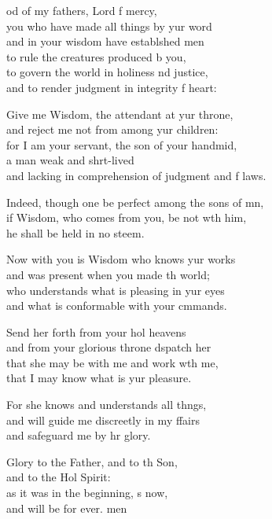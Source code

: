 \settowidth{\versewidth}{Indeed, though one be perfect among the sons of men, +}
\begin{psalmverse}%
  \begin{patverse}
od of my fathers, Lord f mercy,\Med\\
you who have made all things by yur word\\
and in your wisdom have establ\pointup{\i}shed men\Med\\
to rule the creatures produced b you,\\
to govern the world in holiness nd justice,\Med\\
and to render judgment in integrity f heart:

Give me Wisdom, the attendant at yur throne,\Med\\
and reject me not from among yur children:\\
for I am your servant, the son of your handmid,\Flex\\
a man weak and shrt-lived\Med\\
and lacking in comprehension of judgment and f laws.

Indeed, though one be perfect among the sons of mn,\Flex\\
if Wisdom, who comes from you, be not w\pointup{\i}th him,\Med\\
he shall be held in no steem.

Now with you is Wisdom who knows yur works\Med\\
and was present when you made th world;\\
who understands what is pleasing in yur eyes\Med\\
and what is conformable with your cmmands.

Send her forth from your hol heavens\Med\\
and from your glorious throne d\pointup{\i}spatch her\\
that she may be with me and work w\pointup{\i}th me,\Med\\
that I may know what is yur pleasure.

For she knows and understands all th\pointup{\i}ngs,\Flex\\
and will guide me discreetly in my ffairs\Med\\
and safeguard me by hr glory.

Glory to the Father, and to th Son,\Med\\
and to the Hol Spirit:\\
as it was in the beginning, \pointup{\i}s now,\Med\\
and will be for ever. men
  \end{patverse}
\end{psalmverse}
